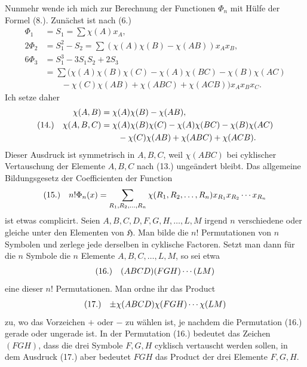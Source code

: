 \documentclass[11pt]{article}
\makeatletter
\newcommand{\Hgrp}{\mathfrak{H}}
\newcommand{\frobtag}[2]{\[\begin{array}{@{}r@{\quad}l@{}}\textup{(#1)} & \displaystyle #2\end{array}\]}
\newcommand{\frobtagc}[2]{\[\begin{array}{@{}r@{\quad}c@{}}\textup{(#1)} & \displaystyle #2\end{array}\]}
\makeatother
\begin{document}
Nunmehr wende ich mich zur Berechnung der Functionen $\Phi_n$ mit Hülfe der Formel (8.). Zunächst ist nach (6.)
\[
\begin{aligned}
\Phi_1&=S_1=\sum\chi(A)x_A,\\
2\Phi_2&=S_1^2-S_2=\sum(\chi(A)\chi(B)-\chi(AB))x_Ax_B,\\
6\Phi_3&=S_1^3-3S_1S_2+2S_3\\
&=\sum\bigl(\chi(A)\chi(B)\chi(C)-\chi(A)\chi(BC)-\chi(B)\chi(AC)\\
&\qquad-\chi(C)\chi(AB)+\chi(ABC)+\chi(ACB)\bigr)x_Ax_Bx_C.
\end{aligned}
\]
Ich setze daher
\frobtag{14.}{\begin{aligned}
\chi(A,B)&=\chi(A)\chi(B)-\chi(AB),\\
\chi(A,B,C)&=\chi(A)\chi(B)\chi(C)-\chi(A)\chi(BC)-\chi(B)\chi(AC)\\
&\qquad-\chi(C)\chi(AB)+\chi(ABC)+\chi(ACB).
\end{aligned}}
Dieser Ausdruck ist symmetrisch in $A,B,C$, weil $\chi(ABC)$ bei cyklischer Vertauschung der Elemente $A,B,C$ nach (13.) ungeändert bleibt. Das allgemeine Bildungsgesetz der Coefficienten der Function
\frobtagc{15.}{n!\Phi_n(x)=\sum_{R_1,R_2,\ldots,R_n}\chi(R_1,R_2,\ldots,R_n)x_{R_1}x_{R_2}\cdots x_{R_n}}
ist etwas complicirt. Seien $A,B,C,D,F,G,H,\ldots,L,M$ irgend $n$ verschiedene oder gleiche unter den Elementen von $\Hgrp$. Man bilde die $n!$ Permutationen von $n$ Symbolen und zerlege jede derselben in cyklische Factoren. Setzt man dann für die $n$ Symbole die $n$ Elemente $A,B,C,\ldots,L,M$, so sei etwa
\frobtagc{16.}{(ABCD)(FGH)\cdots(LM)}
eine dieser $n!$ Permutationen. Man ordne ihr das Product
\frobtagc{17.}{\pm\chi(ABCD)\chi(FGH)\cdots\chi(LM)}
zu, wo das Vorzeichen $+$ oder $-$ zu wählen ist, je nachdem die Permutation (16.) gerade oder ungerade ist. In der Permutation (16.) bedeutet das Zeichen $(FGH)$, dass die drei Symbole $F,G,H$ cyklisch vertauscht werden sollen, in dem Ausdruck (17.) aber bedeutet $FGH$ das Product der drei Elemente $F,G,H$.
\end{document}
